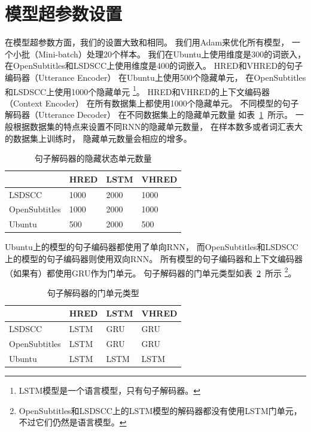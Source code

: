 \section{模型超参数设置}\label{sec:model_hparams}
在模型超参数方面，我们的设置大致和相同。
我们用Adam来优化所有模型，
一个小批（Mini-batch）处理20个样本。
我们在Ubuntu上使用维度是300的词嵌入，
在OpenSubtitles和LSDSCC上使用维度是400的词嵌入。
HRED和VHRED的句子编码器（Utterance Encoder）
在Ubuntu上使用500个隐藏单元，
在OpenSubtitles和LSDSCC上使用1000个隐藏单元
\footnote{LSTM模型是一个语言模型，只有句子解码器。}。
HRED和VHRED的上下文编码器（Context Encoder）
在所有数据集上都使用1000个隐藏单元。
不同模型的句子解码器（Utterance Decoder）
在不同数据集上的隐藏单元数量
如表~\ref{tab:utterance_decoder_hidden_units}~所示。
一般根据数据集的特点来设置不同RNN的隐藏单元数量，
在样本数多或者词汇表大的数据集上训练时，
隐藏单元数量会相应的增多。

\begin{table}[H]
    \centering
    \caption{句子解码器的隐藏状态单元数量}
    \label{tab:utterance_decoder_hidden_units}
    \begin{tabular}{llll}
        \toprule
        \midrule
        & HRED & LSTM & VHRED \\
        \midrule
        LSDSCC & 1000 & 2000 & 1000 \\
        OpenSubtitles & 1000 & 2000 & 1000 \\
        Ubuntu & 500 & 2000 & 500 \\
        \bottomrule
    \end{tabular}
\end{table}

Ubuntu上的模型的句子编码器都使用了单向RNN，
而OpenSubtitles和LSDSCC上的模型的句子编码器则使用双向RNN。
所有模型的句子编码器和上下文编码器（如果有）都使用GRU作为门单元。
句子解码器的门单元类型如表~\ref{tab:utterance_decoder_gate_types}~所示
\footnote{OpenSubtitles和LSDSCC上的LSTM模型的解码器都没有使用LSTM门单元，不过它们仍然是语言模型。}。
\begin{table}[H]
    \centering
    \caption{句子解码器的门单元类型}
    \label{tab:utterance_decoder_gate_types}
    \begin{tabular}{llll}
        \toprule
        \midrule
        & HRED & LSTM & VHRED \\
        \midrule
        LSDSCC & LSTM & GRU & GRU \\
        OpenSubtitles & LSTM & GRU & GRU \\
        Ubuntu & LSTM & LSTM & LSTM \\
        \bottomrule
    \end{tabular}
\end{table}

